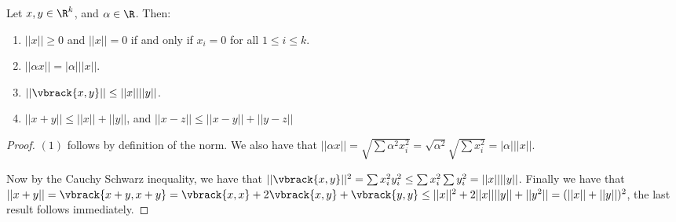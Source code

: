 \begin{theorem}\label{1.5.2}
    Let $x,y \in \R^k$, and  $\alpha \in \R$. Then:
         \begin{enumerate}[label=(\arabic*)]
             \item $||x|| \geq 0$ and $||x||=0$ if and only if $x_i=0$ for all $1 \leq i \leq k$.

             \item $||\alpha x||=|\alpha|||x||$.

             \item $||\vbrack{x,y}|| \leq ||x||||y||$.

             \item $||x+y|| \leq ||x||+||y||$, and $||x-z|| \leq ||x-y||+||y-z||$
        \end{enumerate}
\end{theorem}
\begin{proof}
    $(1)$ follows by definition of the norm. We also have that  $||\alpha x||=\sqrt{\sum{\alpha^2x_i^2}}
    =\sqrt{\alpha^2}\sqrt{\sum{x_i^2}}=|\alpha|||x||$.

    Now by the Cauchy Schwarz inequality, we have that $||\vbrack{x,y}||^2=\sum{x_i^2y_i^2} 
    \leq \sum{x_i^2}\sum{y_i^2}=||x||||y||$. Finally we have that $||x+y||=\vbrack{x+y,x+y}=
    \vbrack{x,x}+2\vbrack{x,y}+\vbrack{y,y } \leq ||x||^2+2||x||||y||+||y^2||=(||x||+||y||)^2$, 
    the last result follows immediately.
\end{proof}
